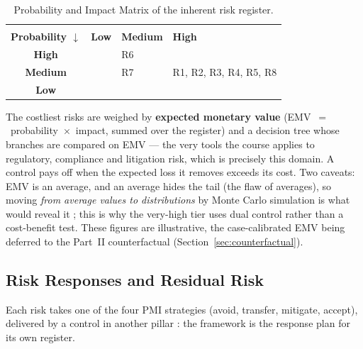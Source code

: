 \documentclass[12pt,a4paper]{article}
\begin{document}
\begin{table}[H]
\centering
\small
{}
\begin{tabular}{@{} c >{\centering\arraybackslash}p{2.3cm} >{\centering\arraybackslash}p{2.3cm} >{\centering\arraybackslash}p{3.6cm} @{}}
\toprule
 & \multicolumn{3}{c}{\textbf{\color{accentdark}Impact} $\rightarrow$} \\
\textbf{\color{accentdark}Probability $\downarrow$} & \textbf{Low} & \textbf{Medium} & \textbf{High} \\
\midrule
\textbf{High}   & \cellcolor{heatmed} & \cellcolor{heathigh} R6 & \cellcolor{heathigh} \\
\textbf{Medium} & \cellcolor{heatlow} & \cellcolor{heatmed} R7 & \cellcolor{heathigh} R1, R2, R3, R4, R5, R8 \\
\textbf{Low}    & \cellcolor{heatlow} & \cellcolor{heatlow} & \cellcolor{heatmed} \\
\bottomrule
\end{tabular}
\caption{Probability and Impact Matrix of the inherent risk register.}
\label{tab:heatmap}
\end{table}

The costliest risks are weighed by \textbf{expected monetary value} (EMV~$=$~probability~$\times$~impact, summed over the register) and a decision tree whose branches are compared on EMV \cite{falchi_slides} --- the very tools the course applies to regulatory, compliance and litigation risk, which is precisely this domain. A control pays off when the expected loss it removes exceeds its cost. Two caveats: EMV is an average, and an average hides the tail (the flaw of averages), so moving \emph{from average values to distributions} by Monte Carlo simulation is what would reveal it \cite{falchi_slides}; this is why the very-high tier uses dual control rather than a cost-benefit test. These figures are illustrative, the case-calibrated EMV being deferred to the Part~II counterfactual (Section~\ref{sec:counterfactual}).

\subsection{Risk Responses and Residual Risk}

Each risk takes one of the four PMI strategies (avoid, transfer, mitigate, accept), delivered by a control in another pillar \cite{falchi_slides}: the framework is the response plan for its own register.
\end{document}
